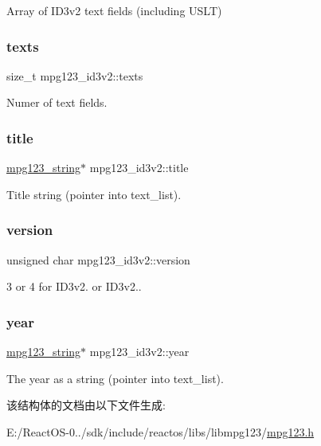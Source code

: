 Array of I\+D3v2 text fields (including U\+S\+LT) \mbox{\label{structmpg123__id3v2_a1ea43150e210d554f297bc317d5fb8ea}} 
\subsubsection{\texorpdfstring{texts}{texts}}
{\footnotesize\ttfamily size\+\_\+t mpg123\+\_\+id3v2\+::texts}

Numer of text fields. \mbox{\label{structmpg123__id3v2_a287e2a93e889c4a9b60b634a4dee4f13}} 
\subsubsection{\texorpdfstring{title}{title}}
{\footnotesize\ttfamily \hyperlink{structmpg123__string}{mpg123\+\_\+string}$\ast$ mpg123\+\_\+id3v2\+::title}

Title string (pointer into text\+\_\+list). \mbox{\label{structmpg123__id3v2_ab64e67e2d2bc5cc0b45e9598a8d386d6}} 
\subsubsection{\texorpdfstring{version}{version}}
{\footnotesize\ttfamily unsigned char mpg123\+\_\+id3v2\+::version}

3 or 4 for I\+D3v2. or I\+D3v2.. \mbox{\label{structmpg123__id3v2_a6b2125b4b38019370646be4dc4a9ad23}} 
\subsubsection{\texorpdfstring{year}{year}}
{\footnotesize\ttfamily \hyperlink{structmpg123__string}{mpg123\+\_\+string}$\ast$ mpg123\+\_\+id3v2\+::year}

The year as a string (pointer into text\+\_\+list). 

该结构体的文档由以下文件生成\+:\begin{DoxyCompactItemize}
\item 
E\+:/\+React\+O\+S-\/0../sdk/include/reactos/libs/libmpg123/\hyperlink{mpg123_8h}{mpg123.\+h}\end{DoxyCompactItemize}
